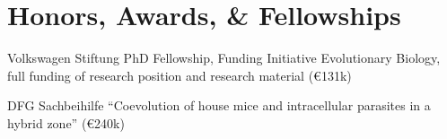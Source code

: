 \documentclass[10pt,a4paper]{article}
\renewenvironment{itemize}{
  \begin{list}{}{
    \setlength{\leftmargin}{2.5em}
    \setlength{\itemsep}{0.25em}
    \setlength{\parskip}{0pt}
    \setlength{\parsep}{0.25em}
  }
}{
  \end{list}
}
\begin{document}

\section*{Honors, Awards, \& Fellowships}
\begin{itemize}
\item [2008] Volkswagen Stiftung PhD Fellowship, Funding Initiative
  Evolutionary Biology, full funding of research position and research
  material (\euro 131k)
\item [2008] DFG Sachbeihilfe ``Coevolution of house mice and
  intracellular parasites in a hybrid zone'' (\euro 240k)
\end{itemize}



\end{document}
